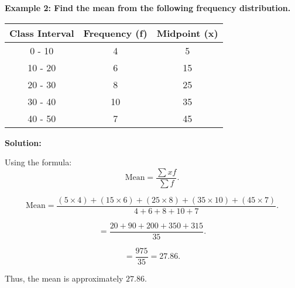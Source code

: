 \begin{flushleft}
	\textbf{Example 2: Find the mean from the following frequency distribution.}
	
	\begin{center}
		\begin{tabular}{c|c|c}
			\textbf{Class Interval} & \textbf{Frequency (f)} & \textbf{Midpoint (x)} \\
			\hline
			0 - 10 & 4 & 5 \\
			10 - 20 & 6 & 15 \\
			20 - 30 & 8 & 25 \\
			30 - 40 & 10 & 35 \\
			40 - 50 & 7 & 45 \\
		\end{tabular}
	\end{center}
	
	\vspace{0.5cm}
	\textbf{Solution:}
	\vspace{0.5cm}
	
	Using the formula:
	\[
	\text{Mean} = \frac{\sum x f}{\sum f}.
	\]
	
	\[
	\text{Mean} = \frac{(5 \times 4) + (15 \times 6) + (25 \times 8) + (35 \times 10) + (45 \times 7)}{4 + 6 + 8 + 10 + 7}.
	\]
	
	\[
	= \frac{20 + 90 + 200 + 350 + 315}{35}.
	\]
	
	\[
	= \frac{975}{35} = 27.86.
	\]
	
	Thus, the mean is approximately $27.86$.
\end{flushleft}

